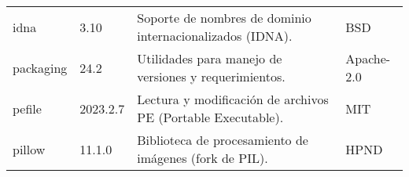 \begin{longtable}[]{@{}llll@{}}
    \begin{minipage}[t]{0.18\columnwidth}\raggedright\strut idna \strut \end{minipage} & \begin{minipage}[t]{0.10\columnwidth}\raggedright\strut 3.10 \strut \end{minipage} & \begin{minipage}[t]{0.49\columnwidth}\raggedright\strut Soporte de nombres de dominio internacionalizados (IDNA). \strut \end{minipage} & \begin{minipage}[t]{0.11\columnwidth}\raggedright\strut BSD \strut \end{minipage} \tabularnewline

    \begin{minipage}[t]{0.18\columnwidth}\raggedright\strut packaging \strut \end{minipage} & \begin{minipage}[t]{0.10\columnwidth}\raggedright\strut 24.2 \strut \end{minipage} & \begin{minipage}[t]{0.49\columnwidth}\raggedright\strut Utilidades para manejo de versiones y requerimientos. \strut \end{minipage} & \begin{minipage}[t]{0.11\columnwidth}\raggedright\strut Apache-2.0 \strut \end{minipage} \tabularnewline

    \begin{minipage}[t]{0.18\columnwidth}\raggedright\strut pefile \strut \end{minipage} & \begin{minipage}[t]{0.10\columnwidth}\raggedright\strut 2023.2.7 \strut \end{minipage} & \begin{minipage}[t]{0.49\columnwidth}\raggedright\strut Lectura y modificación de archivos PE (Portable Executable). \strut \end{minipage} & \begin{minipage}[t]{0.11\columnwidth}\raggedright\strut MIT \strut \end{minipage} \tabularnewline

    \begin{minipage}[t]{0.18\columnwidth}\raggedright\strut pillow \strut \end{minipage} & \begin{minipage}[t]{0.10\columnwidth}\raggedright\strut 11.1.0 \strut \end{minipage} & \begin{minipage}[t]{0.49\columnwidth}\raggedright\strut Biblioteca de procesamiento de imágenes (fork de PIL). \strut \end{minipage} & \begin{minipage}[t]{0.11\columnwidth}\raggedright\strut HPND \strut \end{minipage} \tabularnewline


\end{longtable}
